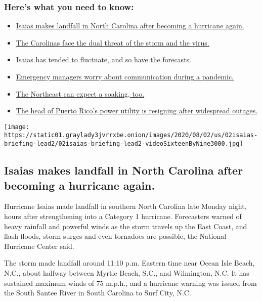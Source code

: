 \hypertarget{heres-what-you-need-to-know}{%
\subsubsection{Here's what you need to
know:}\label{heres-what-you-need-to-know}}

\begin{itemize}
\tightlist
\item
  \protect\hyperlink{link-34a2c843}{Isaias makes landfall in North
  Carolina after becoming a hurricane again.}
\item
  \protect\hyperlink{link-f7e08eb}{The Carolinas face the dual threat of
  the storm and the virus.}
\item
  \protect\hyperlink{link-64deafd3}{Isaias has tended to fluctuate, and
  so have the forecasts.}
\item
  \protect\hyperlink{link-536a9c31}{Emergency managers worry about
  communication during a pandemic.}
\item
  \protect\hyperlink{link-52f7dcb}{The Northeast can expect a soaking,
  too.}
\item
  \protect\hyperlink{link-303d84ae}{The head of Puerto Rico's power
  utility is resigning after widespread outages.}
\end{itemize}

\texttt{[image: https://static01.graylady3jvrrxbe.onion/images/2020/08/02/us/02isaias-briefing-lead2/02isaias-briefing-lead2-videoSixteenByNine3000.jpg]}

\hypertarget{isaias-makes-landfall-in-north-carolina-after-becoming-a-hurricane-again}{%
\subsection{Isaias makes landfall in North Carolina after becoming a
hurricane
again.}\label{isaias-makes-landfall-in-north-carolina-after-becoming-a-hurricane-again}}

Hurricane Isaias made landfall in southern North Carolina late Monday
night, hours after strengthening into a Category 1 hurricane.
Forecasters warned of heavy rainfall and powerful winds as the storm
travels up the East Coast, and flash floods, storm surges and even
tornadoes are possible, the National Hurricane Center said.

The storm made landfall around 11:10 p.m. Eastern time near Ocean Isle
Beach, N.C., about halfway between Myrtle Beach, S.C., and Wilmington,
N.C. It has sustained maximum winds of 75 m.p.h., and a hurricane
warning was issued from the South Santee River in South Carolina to Surf
City, N.C.

